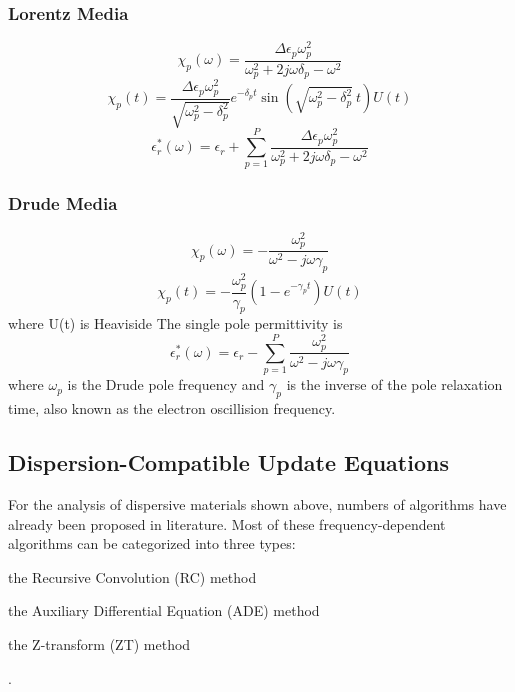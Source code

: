 \subsubsection{Lorentz Media}
\begin{equation}
  \chi_p(\omega) = \frac{\Delta\epsilon_p\omega_p^2}{\omega_p^2 + 2j\omega\delta_p - \omega^2}  
\end{equation}
\begin{equation}
  \chi_p(t) = \frac{\Delta \epsilon_p \omega_p^2}{\sqrt{\omega_p^2 - \delta_p^2}}e^{-\delta_p t}\sin\left(\sqrt{\omega_p^2-\delta_p^2}\ t\right)U(t)
\end{equation}
\begin{equation}
  \epsilon_r^*(\omega) = \epsilon_r + \sum_{p=1}^P \frac{\Delta\epsilon_p\omega_p^2}{\omega_p^2 + 2j\omega\delta_p - \omega^2}  
\end{equation}


\subsubsection{Drude Media}
\begin{equation}
  \chi_p(\omega) = -\frac{\omega_p^2}{\omega^2 - j\omega\gamma_p}  
\end{equation}
\begin{equation}
  \chi_p(t) = -\frac{\omega_p^2}{\gamma_p}\left(1-e^{-\gamma_p t}\right) U(t)
\end{equation}
where U(t) is Heaviside
The single pole permittivity is 
\begin{equation}
  \epsilon_r^*(\omega) = \epsilon_r - \sum_{p=1}^P \frac{\omega_p^2}{\omega^2-j\omega\gamma_p}
\end{equation}
where $\omega_p$ is the Drude pole frequency and $\gamma_p$ is the inverse of the pole relaxation time, also known as the
electron oscillision frequency.



\subsection{Dispersion-Compatible Update Equations}
For the analysis of dispersive materials shown above, numbers of algorithms have already been proposed in literature.
Most of these frequency-dependent algorithms can be categorized into three types: 
\begin{inparaenum}[(1)]
\item the Recursive Convolution (RC) method
\item the Auxiliary Differential Equation (ADE) method
\item the Z-transform (ZT) method
\end{inparaenum}.

